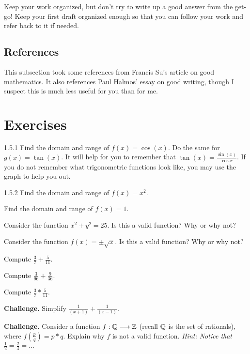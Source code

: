 Keep your work organized, but don't try to write up a good answer from the get-go! Keep your first draft organized enough so that you can follow your work and refer back to it if needed.

\subsection{References}

This subsection took some references from Francis Su's \cite{su:2015} article on good mathematics. It also references Paul Halmos' \cite{halmos} essay on good writing, though I suspect this is much less useful for you than for me. 

\section{Exercises}

\begin{exercise}{1.5.1}
Find the domain and range of $f(x) = \cos(x)$. Do the same for $g(x) = \tan(x)$. It will help for you to remember that $\tan(x) = \frac{\sin(x)}{\cos{x}}$. If you do not remember what trigonometric functions look like, you may use the graph to help you out. 
\end{exercise}

\begin{exercise}{1.5.2}
Find the domain and range of $f(x) = x^2$.
\end{exercise}

\begin{exercise}
Find the domain and range of $f(x) = 1$.
\end{exercise}

\begin{exercise}
Consider the function $x^2 + y^2 = 25$. Is this a valid function? Why or why not?
\end{exercise}

\begin{exercise}
Consider the function $f(x) = \pm\sqrt{x}$. Is this a valid function? Why or why not? 
\end{exercise}

\begin{exercise}
Compute $\frac{3}{7} + \frac{5}{11}$.
\end{exercise}

\begin{exercise}
Compute $\frac{3}{96} + \frac{9}{36}$. 
\end{exercise}

\begin{exercise}
Compute $\frac{3}{7} * \frac{5}{11}$. 
\end{exercise}

\begin{exercise}
\textbf{Challenge.}
Simplify $\frac{1}{(x+1)} + \frac{1}{(x-1)}$. 
\end{exercise}

\begin{exercise}
\textbf{Challenge.}
Consider a function $f : \mathbb{Q} \longrightarrow \mathbb{Z}$ (recall $\mathbb{Q}$ is the set of rationals), where $f(\frac{p}{q}) = p * q$. Explain why $f$ is not a valid function. \textit{Hint: Notice that $\frac{1}{2} = \frac{2}{4} = \dots$}
\end{exercise}